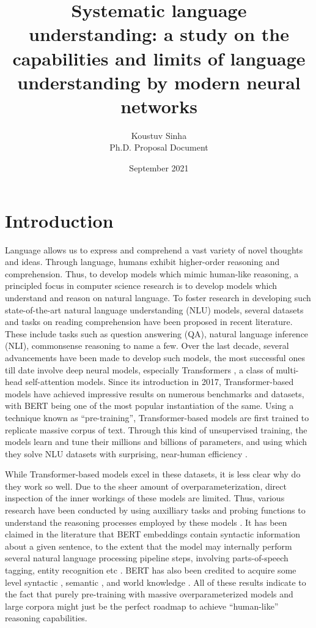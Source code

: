 \documentclass[12pt]{article}
\title{Systematic language understanding: a study on the capabilities and limits of language understanding by modern neural networks}
\author{Koustuv Sinha \\ Ph.D. Proposal Document}
\date{September 2021}
\begin{document}
\maketitle

\section{Introduction}

Language allows us to express and comprehend a vast variety of novel thoughts and ideas. Through language, humans exhibit higher-order reasoning and comprehension. Thus, to develop models which mimic human-like reasoning, a principled focus in computer science research is to develop models which understand and reason on natural language. To foster research in developing such state-of-the-art natural language understanding (NLU) models, several datasets and tasks on reading comprehension have been proposed in recent literature. These include tasks such as question answering (QA), natural language inference (NLI), commonsense reasoning to name a few. Over the last decade, several advancements have been made to develop such models, the most successful ones till date involve deep neural models, especially Transformers \cite{vaswani-etal-2017-attention}, a class of multi-head self-attention models. Since its introduction in 2017, Transformer-based models have achieved impressive results on numerous benchmarks and datasets, with BERT \cite{devlin2018bert} being one of the most popular instantiation of the same. Using a technique known as ``pre-training'', Transformer-based models are first trained to replicate massive corpus of text. Through this kind of unsupervised training, the models learn and tune their millions and billions of parameters, and using which they solve NLU datasets with surprising, near-human efficiency \cite{devlin2018bert,liu-et-al-2019-roberta,lewis-etal-2020-bart}.

While Transformer-based models excel in these datasets, it is less clear why do they work so well. Due to the sheer amount of overparameterization, direct inspection of the inner workings of these models are limited. Thus, various research have been conducted by using auxilliary tasks and probing functions to understand the reasoning processes employed by these models \cite{rogers2020}. It has been claimed in the literature that BERT embeddings contain syntactic information about a given sentence, to the extent that the model may internally perform several natural language processing pipeline steps, involving parts-of-speech tagging, entity recognition etc \cite{tenney-etal-2019-bert}. BERT has also been credited to acquire some level syntactic \cite{hewitt-manning-2019-structural,jawahar-etal-2019-bert}, semantic \cite{ettinger2020}, and world knowledge \cite{petroni2019language, rogers2020}. All of these results indicate to the fact that purely pre-training with massive overparameterized models and large corpora might just be the perfect roadmap to achieve ``human-like'' reasoning capabilities.
\end{document}
